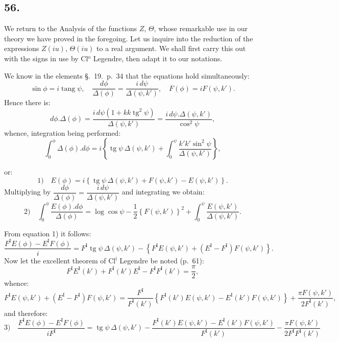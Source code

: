 \documentclass{article}
\begin{document}
\subsection*{56.}

We return to the Analysis of the functions $Z$, $\Theta$, whose remarkable use in our theory we have proved in the foregoing. Let us inquire into the reduction of the expressions $Z(iu)$, $\Theta(iu)$ to a real argument. We shall first carry this out with the signs in use by Cl$^{\mathrm{o}}$ Legendre, then adapt it to our notations.

We know in the elements §.\ 19.\ p.\ 34 that the equations hold simultaneously:
\[
\sin\phi=i\operatorname{tang}\psi,\quad \frac{d\phi}{\Delta(\phi)}=\frac{i\,d\psi}{\Delta(\psi,k')},\quad F(\phi)=iF(\psi,k').
\]
Hence there is:
\[
d\phi.\Delta(\phi)=\frac{i\,d\psi(1+kk\operatorname{tg}^{2}\psi)}{\Delta(\psi,k')}=\frac{i\,d\psi.\Delta(\psi,k')}{\cos^{2}\psi},
\]
whence, integration being performed:
\[
\int_{0}^{\phi}\Delta(\phi).d\phi=i\left\{\operatorname{tg}\psi\,\Delta(\psi,k')+\int_{0}^{\psi}\frac{k'k'\sin^{2}\psi}{\Delta(\psi,k')}\right\},
\]

or:
\[
\text{1)}\quad E(\phi)=i\left\{\operatorname{tg}\psi\,\Delta(\psi,k')+F(\psi,k')-E(\psi,k')\right\}.
\]
Multiplying by $\dfrac{d\phi}{\Delta(\phi)}=\dfrac{i\,d\psi}{\Delta(\psi,k')}$ and integrating we obtain:
\[
\text{2)}\quad \int_{0}^{\phi}\frac{E(\phi).d\phi}{\Delta(\phi)}=\log\cos\psi-\frac{1}{2}\left\{F(\psi,k')\right\}^{2}+\int_{0}^{\psi}\frac{E(\psi,k')}{\Delta(\psi,k')}.
\]

From equation 1) it follows:
\[
\frac{F^{\mathrm{I}}E(\phi)-E^{\mathrm{I}}F(\phi)}{i}=F^{\mathrm{I}}\operatorname{tg}\psi\,\Delta(\psi,k')-\left\{F^{\mathrm{I}}E(\psi,k')+(E^{\mathrm{I}}-F^{\mathrm{I}})F(\psi,k')\right\}.
\]
Now let the excellent theorem of Cl$^{\mathrm{i}}$ Legendre be noted (p.\ 61):
\[
F^{\mathrm{I}}E^{\mathrm{I}}(k')+F^{\mathrm{I}}(k')E^{\mathrm{I}}-F^{\mathrm{I}}F^{\mathrm{I}}(k')=\frac{\pi}{2},
\]
whence:
\[
F^{\mathrm{I}}E(\psi,k')+(E^{\mathrm{I}}-F^{\mathrm{I}})F(\psi,k')=\frac{F^{\mathrm{I}}}{F^{\mathrm{I}}(k')}\left\{F^{\mathrm{I}}(k')E(\psi,k')-E^{\mathrm{I}}(k')F(\psi,k')\right\}+\frac{\pi F(\psi,k')}{2F^{\mathrm{I}}(k')},
\]
and therefore:
\[
\text{3)}\quad \frac{F^{\mathrm{I}}E(\phi)-E^{\mathrm{I}}F(\phi)}{iF^{\mathrm{I}}}=\operatorname{tg}\psi\,\Delta(\psi,k')-\frac{F^{\mathrm{I}}(k')E(\psi,k')-E^{\mathrm{I}}(k')F(\psi,k')}{F^{\mathrm{I}}(k')}-\frac{\pi F(\psi,k')}{2F^{\mathrm{I}}F^{\mathrm{I}}(k')}
\]
\end{document}
